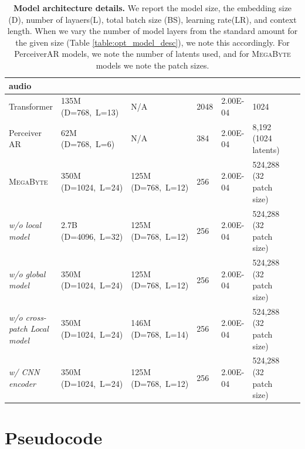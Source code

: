 \documentclass{article}
\newcommand{\fastslow}[0]{\textsc{MegaByte}\xspace}
\newcommand{\megabyte}[0]{\fastslow}
\theoremstyle{plain}
\theoremstyle{definition}
\theoremstyle{remark}
\begin{document}
\begin{table}[h]
\begin{tabular}{llllllll}
\midrule
audio \\
\midrule
Transformer & 135M (D=768,~L=13)  & N/A & 2048  & 2.00E-04 & 1024  \\
Perceiver AR  & 62M (D=768,~L=6) & N/A & 384  & 2.00E-04 & 8,192 (1024 latents) \\
\megabyte  &  350M (D=1024,~L=24) & 125M (D=768,~L=12)  & 256  & 2.00E-04 & 524,288 (32 patch size) \\
\hspace{5pt} \textit{w/o local model} & 2.7B (D=4096,~L=32)  &  125M (D=768,~L=12)  & 256  & 2.00E-04 & 524,288 (32 patch size) \\
\hspace{5pt} \textit{w/o global model}  & 350M (D=1024,~L=24)  &  125M (D=768,~L=12)  & 256  & 2.00E-04 & 524,288 (32 patch size) \\
\hspace{5pt} \textit{w/o cross-patch Local model}  & 350M (D=1024,~L=24) & 146M (D=768,~L=14)  & 256  & 2.00E-04 & 524,288 (32 patch size) \\
\hspace{5pt} \textit{w/ CNN encoder}  & 350M (D=1024,~L=24) & 125M (D=768,~L=12) & 256  & 2.00E-04 & 524,288 (32 patch size) \\
\bottomrule
\end{tabular}
\caption{\textbf{Model architecture details.} We report the model size, the embedding size (D), number of layaers(L), total batch size (BS), learning rate(LR), and context length. When we vary the number of model layers from the standard amount for the given size (Table \ref{table:opt_model_desc}), we note this accordingly. For PerceiverAR models, we note the number of latents used, and for \megabyte models we note the patch sizes.}

\label{tab:model_details}
\end{table}




\section{Pseudocode}
\end{document}
